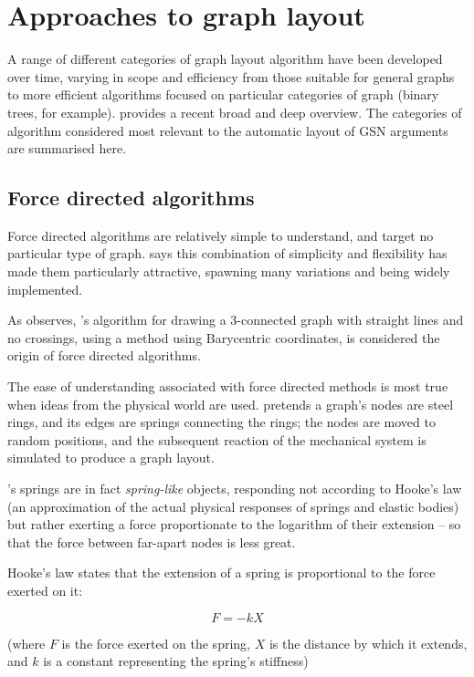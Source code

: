 \section{Approaches to graph layout}

A range of different categories of graph layout algorithm have been developed over time,
varying in scope and efficiency from those suitable for general graphs to more efficient algorithms focused on particular categories of graph (binary trees, for example).
\citet{handbook} provides a recent broad and deep overview.
The categories of algorithm considered most relevant to the automatic layout of GSN arguments are summarised here.



\subsection{Force directed algorithms}

Force directed algorithms are relatively simple to understand, and target no particular type of graph.
\citet{handbook:forcedir} says this combination of simplicity and flexibility has made them particularly attractive,
spawning many variations and being widely implemented.

As \citet{handbook:forcedir} observes, \citet{tutte}'s algorithm for drawing a 3-connected graph with straight lines and no crossings, using a method using Barycentric coordinates, is considered the origin of force directed algorithms.

The ease of understanding associated with force directed methods is most true when ideas from the physical world are used. \citet{eades84} pretends a graph's nodes are steel rings, and its edges are springs connecting the rings; the nodes are moved to random positions, and the subsequent reaction of the mechanical system is simulated to produce a graph layout.

\citeauthor{eades84}'s springs are in fact \emph{spring-like} objects, responding not according to Hooke's law (an approximation of the actual physical responses of springs and elastic bodies) but rather exerting a force proportionate to the logarithm of their extension -- so that the force between far-apart nodes is less great.

Hooke's law states that the extension of a spring is proportional to the force exerted on it:

$$
F = -kX
$$

(where $F$ is the force exerted on the spring,
$X$ is the distance by which it extends,
and $k$ is a constant representing the spring's stiffness)

